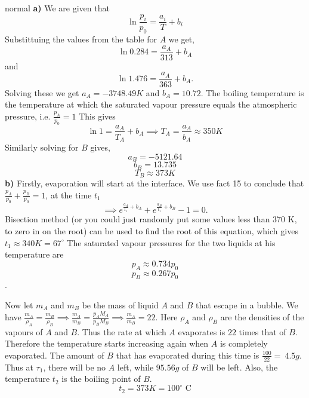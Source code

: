 \begin{solution}{normal}
\textbf{a)} We are given that$$\ln \frac{p_i}{p_0} = \frac{a_i}{T} + b_i$$Substittuing the values from the table for $A$ we get,
$$\ln 0.284 = \frac{a_A}{313} + b_{A}$$and$$\ln 1.476 = \frac{a_A}{363} + b_{A}.$$
Solving these we get $a_A = -3748.49K$ and $b_A = 10.72$.
The boiling temperature is the temperature at which the saturated vapour pressure equals the atmospheric pressure, i.e. $\frac{p_A}{p_0} = 1$
This gives$$\ln 1 = \frac{a_A}{T_{A}} + b_A \implies \boxed{T_{A} = \frac{a_A}{b_A}\approx 350K}$$Similarly solving for $B$ gives,
$$a_B = -5121.64$$$$b_B = 13.735$$$$\boxed{T_B \approx 373K}$$
\textbf{b)} Firstly, evaporation will start at the interface.
We use fact 15 to conclude that $\frac{p_A}{p_0} + \frac{p_B}{p_0} = 1$, at the time $t_1$
$$\implies e^{\frac{a_A}{t_1} + b_A}+e^{\frac{a_B}{t_1} + b_B}-1 =0.$$
Bisection method (or you could just randomly put some values less than 370 K, to zero in on the root) can be used to find the root of this equation, which gives $\boxed{t_1 \approx340 K =  67^{\circ}}$
The saturated vapour pressures for the two liquids at his temperature are$$p_A \approx 0.734 p_0$$$$p_B \approx 0.267p_0$$.

Now let $m_A$ and $m_B$ be the mass of liquid $A$ and $B$ that escape in a bubble. We have $\frac{m_A}{\rho_A} = \frac{m_B}{\rho_B} \implies\frac{m_A}{m_B} =  \frac{p_AM_A}{p_BM_B} \implies \frac{m_A}{m_B} = 22$. Here $\rho_A$ and $\rho_B$ are the densities of the vapours of $A$ and $B$.
Thus the rate at which $A$ evaporates is $22$ times that of $B$.
Therefore the temperature starts increasing again when $A$ is completely evaporated. The amount of $B$ that has evaporated during this time is $\frac{100}{22}= \ 4.5g$.
Thus at $\tau_1$, there will be no $A$ left, while $95.56g$ of $B$ will be left.
Also, the temperature $t_2$ is the boiling point of $B$.
$$\boxed{t_2 = 373K=100^{\circ} \text{ C}}$$
\end{solution}
